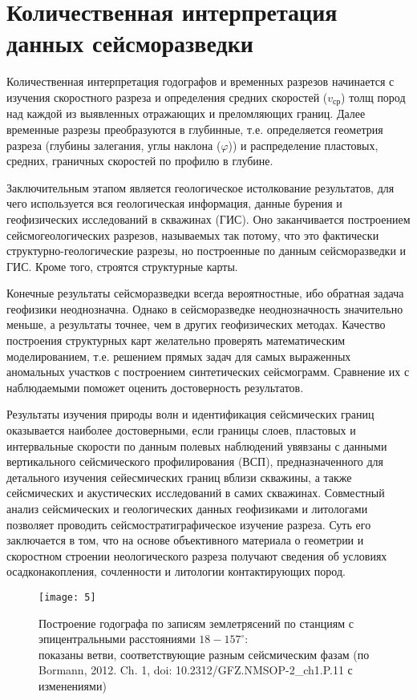 \section*{Количественная интерпретация данных сейсморазведки}

Количественная интерпретация годографов и временных разрезов начинается с изучения скоростного разреза и определения средних скоростей ($v_{ср}$) толщ пород над каждой из выявленных отражающих и преломляющих границ. Далее временные разрезы преобразуются в глубинные, т.е. определяется геометрия разреза (глубины залегания, углы наклона ($\varphi$)) и распределение пластовых, средних, граничных скоростей по профилю в глубине.

Заключительным этапом является геологическое истолкование результатов, для чего используется вся геологическая информация, данные бурения и геофизических исследований в скважинах (ГИС). Оно заканчивается построением сейсмогеологических разрезов, называемых так потому, что это фактически структурно-геологические разрезы, но построенные по данным сейсморазведки и ГИС. Кроме того, строятся структурные карты.

Конечные результаты сейсморазведки всегда вероятностные, ибо обратная задача геофизики неоднозначна. Однако в сейсморазведке неоднозначность значительно меньше, а результаты точнее, чем в других геофизических методах. Качество построения структурных карт желательно проверять математическим моделированием, т.е. решением прямых задач для самых выраженных аномальных участков с построением синтетических сейсмограмм. Сравнение их с наблюдаемыми поможет оценить достоверность результатов.

Результаты изучения природы волн и идентификация сейсмических границ оказывается наиболее достоверными, если границы слоев, пластовых и интервальные скорости по данным полевых наблюдений увявзаны с данными вертикального сейсмического профилирования (ВСП), предназначенного для детального изучения сейесмических границ вблизи скважины, а также сейсмических и акустических исследований в самих скважинах. Совместный анализ сейсмических и геологических данных геофизиками и литологами позволяет проводить сейсмостратиграфическое изучение разреза. Суть его заключается в том, что на основе объективного материала о геометрии и скоростном строении неологического разреза получают сведения об условиях осадконакопления, сочленности и литологии контактирующих пород.

\begin{figure}[H]
	\centering
	\texttt{[image: 5]}
	\caption{Построение годографа по записям землетрясений по станциям с эпицентральными расстояниями $18 - 157^{\circ}$:\\{\footnotesize показаны ветви, соответствующие разным сейсмическим фазам (по Bormann, 2012. Ch. 1, doi: 10.2312/GFZ.NMSOP-2\_ch1.P.11 с изменениями)}}
	\label{5}
\end{figure}